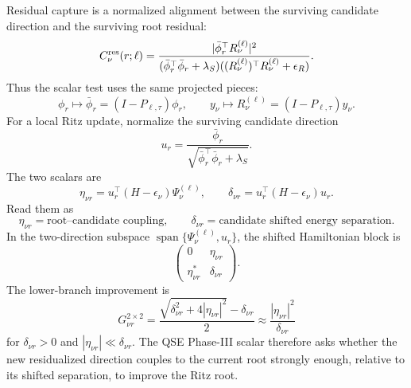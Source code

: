 \documentclass[10pt,twocolumn]{article}
\begin{document}
Residual capture is a normalized alignment between the surviving candidate direction and the surviving root residual:
\begin{equation}
C_{\nu}^{\rm res}(r;\ell)
=
\frac{
|\bar\phi_r^\top R_\nu^{(\ell)}|^2
}{
(\bar\phi_r^\top\bar\phi_r+\lambda_S)
((R_\nu^{(\ell)})^\top R_\nu^{(\ell)}+\epsilon_R)
}.
\label{eq:qse_residual_capture_bridge}
\end{equation}
Thus the scalar test uses the same projected pieces:
\begin{equation}
\phi_r\mapsto\bar\phi_r=(I-P_{\ell,\tau})\phi_r,
\qquad
y_\nu\mapsto R_\nu^{(\ell)}=(I-P_{\ell,\tau})y_\nu.
\label{eq:qse_two_residuals}
\end{equation}
For a local Ritz update, normalize the surviving candidate direction
\begin{equation}
u_r=\frac{\bar\phi_r}{\sqrt{\bar\phi_r^\top\bar\phi_r+\lambda_S}}.
\label{eq:qse_candidate_unit_bridge}
\end{equation}
The two scalars are
\begin{equation}
\eta_{\nu r}=u_r^\top(H-\epsilon_\nu)\Psi_\nu^{(\ell)},
\qquad
\delta_{\nu r}=u_r^\top(H-\epsilon_\nu)u_r.
\label{eq:qse_eta_delta_bridge}
\end{equation}
Read them as
\begin{equation}
\eta_{\nu r}=\text{root--candidate coupling},
\qquad
\delta_{\nu r}=\text{candidate shifted energy separation}.
\label{eq:qse_eta_delta_reading}
\end{equation}
In the two-direction subspace \(\operatorname{span}\{\Psi_\nu^{(\ell)},u_r\}\), the shifted Hamiltonian block is
\begin{equation}
\begin{pmatrix}
0&\eta_{\nu r}\\
\eta_{\nu r}^{*}&\delta_{\nu r}
\end{pmatrix}.
\label{eq:qse_shifted_block_bridge}
\end{equation}
The lower-branch improvement is
\begin{equation}
\boxed{
G_{\nu r}^{2\times2}
=
\frac{
\sqrt{\delta_{\nu r}^{2}+4|\eta_{\nu r}|^2}
-\delta_{\nu r}
}{2}
\approx
\frac{|\eta_{\nu r}|^2}{\delta_{\nu r}}
}
\label{eq:qse_2x2_gain_bridge}
\end{equation}
for \(\delta_{\nu r}>0\) and \(|\eta_{\nu r}|\ll\delta_{\nu r}\). The QSE Phase-III scalar therefore asks whether the new residualized direction couples to the current root strongly enough, relative to its shifted separation, to improve the Ritz root.
\end{document}
